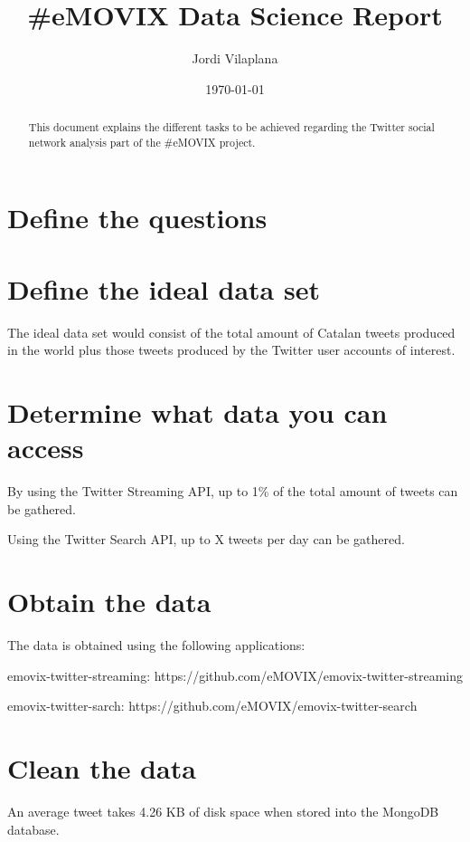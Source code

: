 \documentclass[a4paper]{article}
\title{\#eMOVIX Data Science Report}
\author{Jordi Vilaplana}
\date{\today}
\begin{document}
\maketitle

\begin{abstract}
This document explains the different tasks to be achieved regarding the Twitter social network analysis part of the \#eMOVIX project.
\end{abstract}

\section{Define the questions}
\label{sec:questions_definition}



\section{Define the ideal data set}

The ideal data set would consist of the total amount of Catalan tweets produced in the world plus those tweets produced by the Twitter user accounts of interest.

\section{Determine what data you can access}

By using the Twitter Streaming API, up to 1\% of the total amount of tweets can be gathered.

Using the Twitter Search API, up to X tweets per day can be gathered.

\section{Obtain the data}

The data is obtained using the following applications:

emovix-twitter-streaming: https://github.com/eMOVIX/emovix-twitter-streaming

emovix-twitter-sarch: https://github.com/eMOVIX/emovix-twitter-search

\section{Clean the data}

An average tweet takes 4.26 KB of disk space when stored into the MongoDB database.
\end{document}
